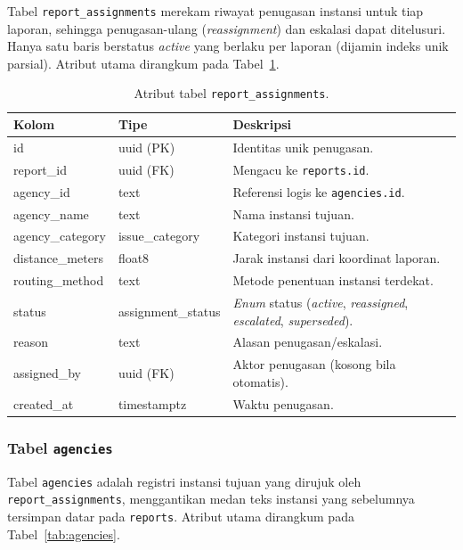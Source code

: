 Tabel \texttt{report\_assignments} merekam riwayat penugasan instansi untuk tiap laporan, sehingga penugasan-ulang (\textit{reassignment}) dan eskalasi dapat ditelusuri. Hanya satu baris berstatus \textit{active} yang berlaku per laporan (dijamin indeks unik parsial). Atribut utama dirangkum pada Tabel~\ref{tab:report-assignments}.

\begin{table}[htbp]
\centering
\caption{Atribut tabel \texttt{report\_assignments}.}
\label{tab:report-assignments}
\small
\begin{tabular}{p{3.4cm} p{2.6cm} p{6.5cm}}
\toprule
\textbf{Kolom} & \textbf{Tipe} & \textbf{Deskripsi} \\
\midrule
id & uuid (PK) & Identitas unik penugasan. \\
report\_id & uuid (FK) & Mengacu ke \texttt{reports.id}. \\
agency\_id & text & Referensi logis ke \texttt{agencies.id}. \\
agency\_name & text & Nama instansi tujuan. \\
agency\_category & issue\_category & Kategori instansi tujuan. \\
distance\_meters & float8 & Jarak instansi dari koordinat laporan. \\
routing\_method & text & Metode penentuan instansi terdekat. \\
status & assignment\_status & \textit{Enum} status (\textit{active}, \textit{reassigned}, \textit{escalated}, \textit{superseded}). \\
reason & text & Alasan penugasan/eskalasi. \\
assigned\_by & uuid (FK) & Aktor penugasan (kosong bila otomatis). \\
created\_at & timestamptz & Waktu penugasan. \\
\bottomrule
\end{tabular}
\end{table}

\subsubsection{Tabel \texttt{agencies}}

Tabel \texttt{agencies} adalah registri instansi tujuan yang dirujuk oleh \texttt{report\_assignments}, menggantikan medan teks instansi yang sebelumnya tersimpan datar pada \texttt{reports}. Atribut utama dirangkum pada Tabel~\ref{tab:agencies}.

